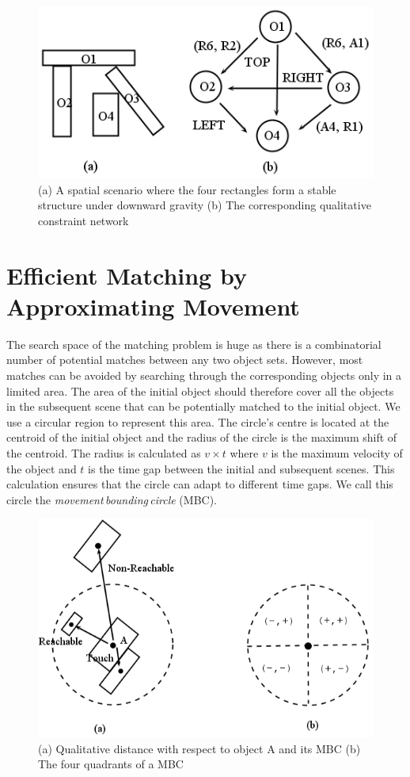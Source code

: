 \documentclass[letterpaper]{article}
\begin{document}
 \begin{figure}[h!]
\centering\includegraphics[scale=0.35]{QCN.png}\caption{(a) A spatial scenario where the four rectangles form a stable structure under downward gravity (b) The corresponding qualitative constraint network}
\label{QCN}
\end{figure}

\section{Efficient Matching by Approximating Movement}\label{approxM}

The search space of the matching problem is huge as there is a combinatorial number of potential matches between any two object sets. However, most matches can be avoided by searching through the corresponding objects only in a limited area. The area of the initial object should therefore cover all the objects in the subsequent scene that can be potentially matched to the initial object.  We use a circular region to represent this area. The circle's centre is located at the centroid of the initial object and the radius of the circle is the maximum shift of the centroid. The radius is calculated as $v \times t$ where $v$ is the maximum velocity of the object and $t$ is the time gap between the initial and subsequent scenes. This calculation ensures that the circle can adapt to different time gaps. We call this circle the \emph{movement\,bounding\,circle} (MBC).  
\begin{figure}[h!]
\centering\includegraphics[scale=0.3]{quadrants.png}\caption{(a) Qualitative distance with respect to object A and its MBC (b)  The four quadrants of a MBC }
\label{Quadrants}
\end{figure}
\end{document}
